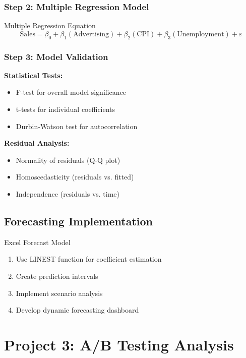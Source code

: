 \documentclass[12pt,a4paper]{book}
\begin{document}
{{\subsubsection{Step 2: Multiple Regression Model}

\begin{definition}{Multiple Regression Equation}
\[
\text{Sales} = \beta_0 + \beta_1(\text{Advertising}) + \beta_2(\text{CPI}) + \beta_3(\text{Unemployment}) + \varepsilon
\]
\end{definition}

\subsubsection{Step 3: Model Validation}

\textbf{Statistical Tests:}
\begin{itemize}
    \item F-test for overall model significance
    \item t-tests for individual coefficients
    \item Durbin-Watson test for autocorrelation
\end{itemize}

\textbf{Residual Analysis:}
\begin{itemize}
    \item Normality of residuals (Q-Q plot)
    \item Homoscedasticity (residuals vs. fitted)
    \item Independence (residuals vs. time)
\end{itemize}

\subsection{Forecasting Implementation}

\begin{example}{Excel Forecast Model}
\begin{enumerate}
    \item Use LINEST function for coefficient estimation
    \item Create prediction intervals
    \item Implement scenario analysis
    \item Develop dynamic forecasting dashboard
\end{enumerate}
\end{example}

\section{Project 3: A/B Testing Analysis}

}}
\end{document}
